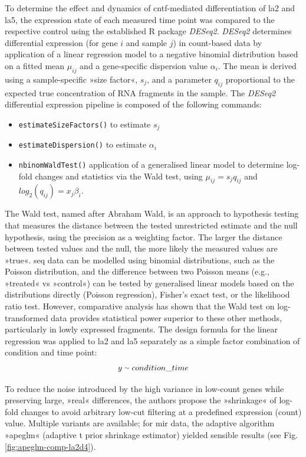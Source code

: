 \begin{method}
To determine the effect and dynamics of \ac{cntf}-mediated differentiation of \ac{la2} and \ac{la5}, the expression state of each measured time point was compared to the respective control using the established R package \textit{DESeq2}.\cite{Love2014} \textit{DESeq2} determines differential expression (for gene $i$ and sample $j$) in count-based data by application of a linear regression model to a negative binomial distribution based on a fitted mean $\mu_{ij}$ and a gene-specific dispersion value $\alpha_i$. The mean is derived using a sample-specific »size factor«, $s_j$, and a parameter $q_{ij}$ proportional to the expected true concentration of RNA fragments in the sample. The \textit{DESeq2} differential expression pipeline is composed of the following commands:
\begin{itemize}[noitemsep, leftmargin=.5cm, label={\tiny\raisebox{1ex}{\textbullet}}]
\item \texttt{estimateSizeFactors()} to estimate $s_j$
\item \texttt{estimateDispersion()} to estimate $\alpha_i$
\item \texttt{nbinomWaldTest()} application of a generalised linear model to determine log-fold changes and statistics via the Wald test, using $\mu_{ij} = s_jq_{ij}$ and $log_2(q_{ij}) = x_j\beta_i$.
\end{itemize}
The Wald test, named after Abraham Wald,\cite{Wald1939} is an approach to hypothesis testing that measures the distance between the tested unrestricted estimate and the null hypothesis, using the precision as a weighting factor. The larger the distance between tested values and the null, the more likely the measured values are »true«. \ac{seq} data can be modelled using binomial distributions,\cite{Bullard2010} such as the Poisson distribution, and the difference between two Poisson means (e.g., »treated« vs »control«) can be tested by generalised linear models based on the distributions directly (Poisson regression), Fisher's exact test, or the likelihood ratio test. However, comparative analysis has shown that the Wald test on log-transformed data provides statistical power superior to these other methods,\cite{Chen2011} particularly in lowly expressed fragments. The design formula for the linear regression was applied to \ac{la2} and \ac{la5} separately as a simple factor combination of condition and time point: $$y \smallsim condition\_time$$

To reduce the noise introduced by the high variance in low-count genes while preserving large, »real« differences, the authors propose the »shrinkage« of log-fold changes to avoid arbitrary low-cut filtering at a predefined expression (count) value. Multiple variants are available; for \ac{mir} data, the adaptive algorithm »apeglm«\cite{Zhu2019} (adaptive t prior shrinkage estimator) yielded sensible results (see Fig.\,\ref{fig:apeglm-comp-la2d4}).

\end{method}

